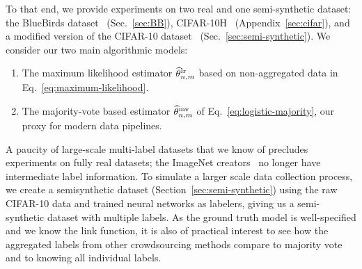 To that end, we provide experiments on two real and one
semi-synthetic dataset: the BlueBirds dataset~\cite{WelinderBrPeBe10}
(Sec.~\ref{sec:BB}), CIFAR-10H~\cite{PetersonBaGrRu19}
(Appendix~\ref{sec:cifar}), and a modified version of the
CIFAR-10 dataset~\cite{KrizhevskyHi09} (Sec.~\ref{sec:semi-synthetic}). We
consider our two main algorithmic models:
\begin{enumerate}[label=(\roman*),leftmargin=*]
  \setlength{\itemsep}{0pt}
\item The maximum likelihood estimator $\widehat{\theta}^{\textup{lr}}_{n,m}$ based on non-aggregated data in
  Eq.~\eqref{eq:maximum-likelihood}.
\item The majority-vote based estimator $\widehat{\theta}^{\textup{mv}}_{n,m}$ of
  Eq.~\eqref{eq:logistic-majority}, our proxy for modern data
  pipelines.
\end{enumerate}
%
A paucity of large-scale multi-label datasets that we know of
precludes experiments on fully real datasets; the ImageNet
creators~\cite{DengDoSoLiLiFe09, RussakovskyDeSuKrSaMaHuKaKhBeBeFe15} no
longer have intermediate label information. To
simulate a larger scale data collection process, we create a
semisynthetic dataset (Section~\ref{sec:semi-synthetic}) using the raw
CIFAR-10 data and trained neural networks as labelers, giving us a
semi-synthetic dataset with multiple labels.
%
As the ground truth model is
well-specified and we know the link function, it is also of practical
interest to see how the aggregated labels from other crowdsourcing methods
compare to majority vote and to knowing all individual labels.



